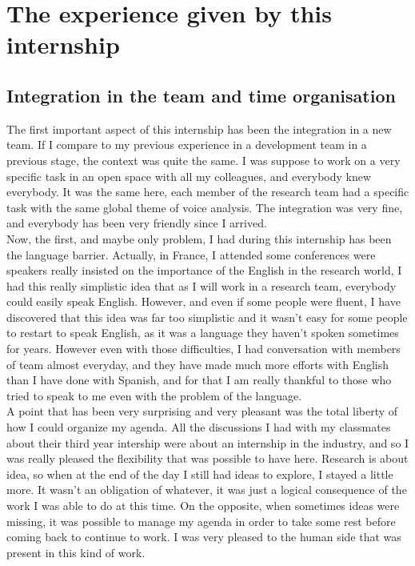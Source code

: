 \documentclass{report}
\begin{document}
	\chapter{The experience given by this internship}
	
	\section{Integration in the team and time organisation}
	
	The first important aspect of this internship has been the integration in a new team. If I compare to my previous experience in a development team in a previous stage, the context was quite the same. I was suppose to work on a very specific task in an open space with all my colleagues, and everybody knew everybody. It was the same here, each member of the research team had a specific task with the same global theme of voice analysis. The integration was very fine, and everybody has been very friendly since I arrived.\\
	
	Now, the first, and maybe only problem, I had during this internship has been the language barrier. Actually, in France, I attended some conferences were speakers really insisted on the importance of the English in the research world, I had this really simplistic idea that as I will work in a research team, everybody could easily speak English. However, and even if some people were fluent, I have discovered that this idea was far too simplistic and it wasn't easy for some people to restart to speak English, as it was a language they haven't spoken sometimes for years. However even with those difficulties, I had conversation with members of team almost everyday, and they have made much more efforts with English than I have done with Spanish, and for that I am really thankful to those who tried to speak to me even with the problem of the language.\\
	
	A point that has been very surprising and very pleasant was the total liberty of how I could organize my agenda. All the discussions I had with my classmates about their third year intership were about an internship in the industry, and so I was really pleased the flexibility that was possible to have here. Research is about idea, so when at the end of the day I still had ideas to explore, I stayed a little more. It wasn't an obligation of whatever, it was just a logical consequence of the work I was able to do at this time. On the opposite, when sometimes ideas were missing, it was possible to manage my agenda in order to take some rest before coming back to continue to work. I was very pleased to the human side that was present in this kind of work.
	
\end{document}
